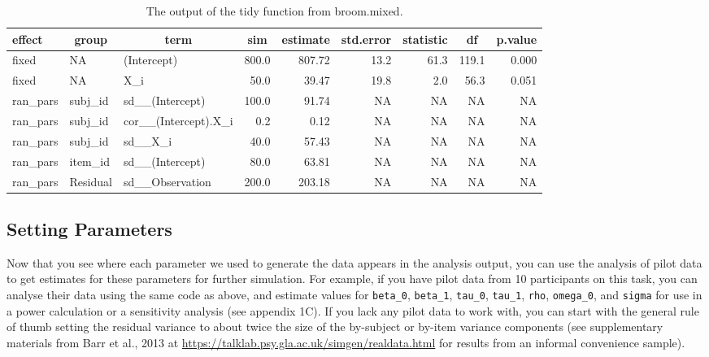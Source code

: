 \documentclass[
  english,
  doc,floatsintext]{apa6}
\begin{document}
\begin{table}[H]

\begin{center}
\begin{threeparttable}

\caption{\label{tab:broom-tidy-table}The output of the tidy function from broom.mixed.}

\footnotesize{

\begin{tabular}{lllrrrrrr}
\toprule
effect & \multicolumn{1}{c}{group} & \multicolumn{1}{c}{term} & \multicolumn{1}{c}{sim} & \multicolumn{1}{c}{estimate} & \multicolumn{1}{c}{std.error} & \multicolumn{1}{c}{statistic} & \multicolumn{1}{c}{df} & \multicolumn{1}{c}{p.value}\\
\midrule
fixed & NA & (Intercept) & 800.0 & 807.72 & 13.2 & 61.3 & 119.1 & 0.000\\
fixed & NA & X\_i & 50.0 & 39.47 & 19.8 & 2.0 & 56.3 & 0.051\\
ran\_pars & subj\_id & sd\_\_(Intercept) & 100.0 & 91.74 & NA & NA & NA & NA\\
ran\_pars & subj\_id & cor\_\_(Intercept).X\_i & 0.2 & 0.12 & NA & NA & NA & NA\\
ran\_pars & subj\_id & sd\_\_X\_i & 40.0 & 57.43 & NA & NA & NA & NA\\
ran\_pars & item\_id & sd\_\_(Intercept) & 80.0 & 63.81 & NA & NA & NA & NA\\
ran\_pars & Residual & sd\_\_Observation & 200.0 & 203.18 & NA & NA & NA & NA\\
\bottomrule
\end{tabular}

}

\end{threeparttable}
\end{center}

\end{table}

\hypertarget{setting-parameters}{%
\subsection{Setting Parameters}\label{setting-parameters}}

Now that you see where each parameter we used to generate the data appears in the analysis output, you can use the analysis of pilot data to get estimates for these parameters for further simulation. For example, if you have pilot data from 10 participants on this task, you can analyse their data using the same code as above, and estimate values for \texttt{beta\_0}, \texttt{beta\_1}, \texttt{tau\_0}, \texttt{tau\_1}, \texttt{rho}, \texttt{omega\_0}, and \texttt{sigma} for use in a power calculation or a sensitivity analysis (see appendix 1C). If you lack any pilot data to work with, you can start with the general rule of thumb setting the residual variance to about twice the size of the by-subject or by-item variance components (see supplementary materials from Barr et al., 2013 at \url{https://talklab.psy.gla.ac.uk/simgen/realdata.html} for results from an informal convenience sample).
\end{document}
